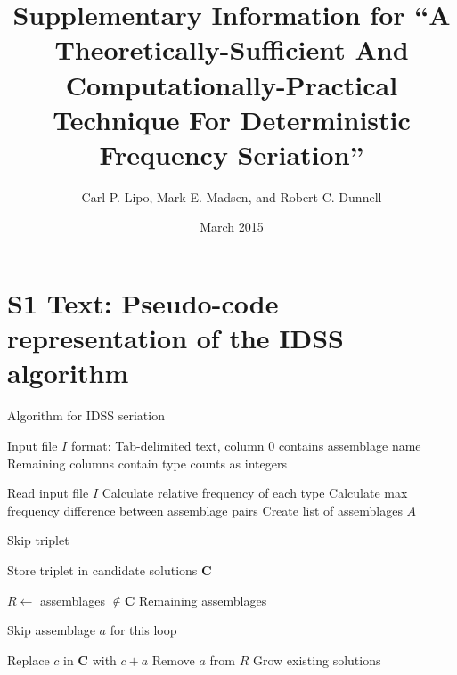 \documentclass[10pt]{article}
\begin{document}
\title{Supplementary Information for ``A Theoretically-Sufficient And Computationally-Practical Technique For Deterministic Frequency Seriation''}
\author{Carl P. Lipo, Mark E. Madsen, and Robert C. Dunnell}
\date{March 2015}
\maketitle



\section*{S1 Text:  Pseudo-code representation of the IDSS algorithm}


\begin{algorithm}[h]
\caption{Algorithm for IDSS seriation}\label{alg:idss}
\begin{algorithmic}[1]

 \Require  Input file $I$ format:  
 \State Tab-delimited text, column 0 contains assemblage name
 \State Remaining columns contain type counts as integers

   
   \State Read input file $I$
   \State Calculate relative frequency of each type
   \State Calculate max frequency difference between assemblage pairs
   \State Create list of assemblages $A$
    
            \State Skip triplet
            \EndIf
        \EndIf

            \State Store triplet in candidate solutions $\mathbf{C}$
        \EndIf

        

        \State $R \gets$ assemblages $\notin \mathbf{C}$  
        \Comment Remaining assemblages
        

        \Repeat
                        \State Skip assemblage $a$ for this loop
                    \EndIf
                \EndIf
                
                    \State Replace $c$ in $\mathbf{C}$ with $c+a$
                    \State Remove $a$ from $R$
                    \Comment Grow existing solutions
                \EndIf
            

\end{algorithmic}
\end{algorithm}
\end{document}
